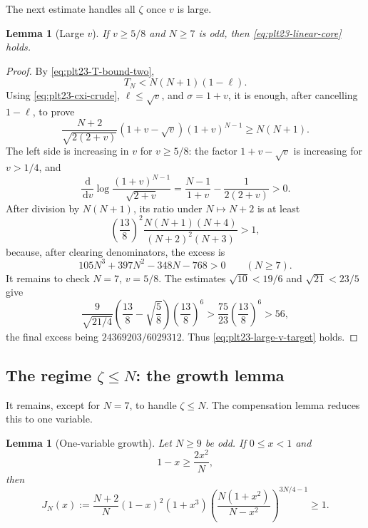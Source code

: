 \documentclass[11pt]{article}
\newtheorem{lemma}[theorem]{Lemma}
\numberwithin{equation}{section}
\newcommand{\dd}{\,\mathrm d}
\begin{document}
The next estimate handles all $\zeta$ once $v$ is large.

\begin{lemma}[Large $v$]\label{lem:plt23-linear-large-v}
  If $v\ge5/8$ and $N\ge7$ is odd, then
  \eqref{eq:plt23-linear-core} holds.
\end{lemma}

\begin{proof}
  By \eqref{eq:plt23-T-bound-two},
  \begin{equation}\label{eq:plt23-T-geometric-cancel}
    T_N<N(N+1)(1-\ell).
  \end{equation}
  Using \eqref{eq:plt23-cxi-crude}, $\ell\le\sqrt v$, and
  $\sigma=1+v$, it is enough, after cancelling $1-\ell$, to prove
  \begin{equation}\label{eq:plt23-large-v-target}
    \frac{N+2}{\sqrt{2(2+v)}}
    (1+v-\sqrt v)(1+v)^{N-1}
    \ge N(N+1).
  \end{equation}
  The left side is increasing in $v$ for $v\ge5/8$: the factor
  $1+v-\sqrt v$ is increasing for $v>1/4$, and
  \[
    \frac{\dd}{\dd v}\log\frac{(1+v)^{N-1}}{\sqrt{2+v}}
    =\frac{N-1}{1+v}-\frac{1}{2(2+v)}>0.
  \]
  After division by $N(N+1)$, its ratio under $N\mapsto N+2$ is at least
  \[
    \left(\frac{13}{8}\right)^2
    \frac{N(N+1)(N+4)}{(N+2)^2(N+3)}>1,
  \]
  because, after clearing denominators, the excess is
  \[
    105N^3+397N^2-348N-768>0
    \qquad(N\ge7).
  \]
  It remains to check $N=7$, $v=5/8$.  The estimates
  $\sqrt{10}<19/6$ and $\sqrt{21}<23/5$ give
  \[
    \frac{9}{\sqrt{21/4}}
    \left(\frac{13}{8}-\sqrt{\frac{5}{8}}\right)
    \left(\frac{13}{8}\right)^6
    >\frac{75}{23}\left(\frac{13}{8}\right)^6
    >56,
  \]
  the final excess being $24369203/6029312$.  Thus
  \eqref{eq:plt23-large-v-target} holds.
\end{proof}

\subsection{The regime \texorpdfstring{$\zeta\le N$}{zeta<=N}: the growth lemma}

It remains, except for $N=7$, to handle $\zeta\le N$.  The compensation
lemma reduces this to one variable.

\begin{lemma}[One-variable growth]\label{lem:plt23-J-growth}
  Let $N\ge9$ be odd.  If $0\le x<1$ and
  \begin{equation}\label{eq:plt23-J-domain}
    1-x\ge\frac{2x^2}{N},
  \end{equation}
  then
  \begin{equation}\label{eq:plt23-J-ineq}
    J_N(x):=
    \frac{N+2}{N}(1-x)^2(1+x^3)
    \left(\frac{N(1+x^2)}{N-x^2}\right)^{3N/4-1}
    \ge1.
  \end{equation}
\end{lemma}
\end{document}
